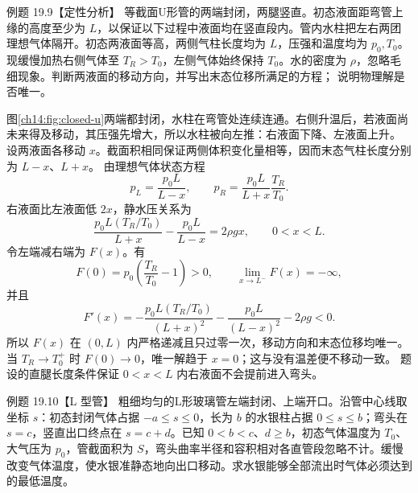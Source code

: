 \begin{origexamplebox}{例题 19.9【定性分析】}
等截面U形管的两端封闭，两腿竖直。初态液面距弯管上缘的高度至少为 $L$，以保证以下过程中液面均在竖直段内。管内水柱把左右两团理想气体隔开。初态两液面等高，两侧气柱长度均为
$L$，压强和温度均为 $p_0,T_0$。现缓慢加热右侧气体至 $T_R>T_0$，左侧气体始终保持
$T_0$。水的密度为 $\rho$，忽略毛细现象。判断两液面的移动方向，并写出末态位移所满足的方程；
说明物理解是否唯一。


\closedUTubeDiagram
\end{origexamplebox}

\begin{xesolution}
图\ref{ch14:fig:closed-u}两端都封闭，水柱在弯管处连续连通。右侧升温后，若液面尚未来得及移动，其压强先增大，所以水柱被向左推：右液面下降、左液面上升。
设两液面各移动 $x$。截面积相同保证两侧体积变化量相等，因而末态气柱长度分别为 $L-x$、$L+x$。
由理想气体状态方程
\[
 p_L=\frac{p_0L}{L-x},\qquad
 p_R=\frac{p_0L}{L+x}\frac{T_R}{T_0}.
\]
右液面比左液面低 $2x$，静水压关系为
\[
 \boxed{\frac{p_0L(T_R/T_0)}{L+x}-\frac{p_0L}{L-x}=2\rho gx},
 \qquad 0<x<L.
\]
令左端减右端为 $F(x)$。有
\[
 F(0)=p_0\!\left(\frac{T_R}{T_0}-1\right)>0,\qquad
 \lim_{x\to L^-}F(x)=-\infty,
\]
并且
\[
 F'(x)=-\frac{p_0L(T_R/T_0)}{(L+x)^2}
       -\frac{p_0L}{(L-x)^2}-2\rho g<0.
\]
所以 $F(x)$ 在 $(0,L)$ 内严格递减且只过零一次，移动方向和末态位移均唯一。
当 $T_R\to T_0^+$ 时 $F(0)\to0$，唯一解趋于 $x=0$；这与没有温差便不移动一致。
题设的直腿长度条件保证 $0<x<L$ 内右液面不会提前进入弯头。
\end{xesolution}

\begin{origexamplebox}{例题 19.10【L 型管】}
粗细均匀的L形玻璃管左端封闭、上端开口。沿管中心线取坐标 $s$：初态封闭气体占据
$-a\le s\le0$，长为 $b$ 的水银柱占据 $0\le s\le b$；弯头在 $s=c$，竖直出口终点在
$s=c+d$。已知 $0<b<c$、$d\ge b$，初态气体温度为 $T_0$、大气压为 $p_0$，管截面积为
$S$，弯头曲率半径和容积相对各直管段忽略不计。缓慢改变气体温度，使水银准静态地向出口移动。求水银能够全部流出时气体必须达到的最低温度。


\lPipeInitialDiagram
\end{origexamplebox}

